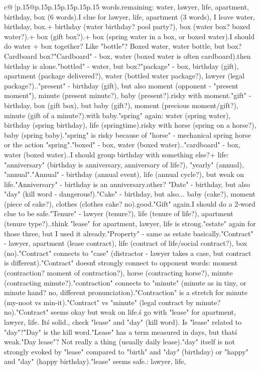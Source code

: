 \documentclass{article}
\begin{document}
{\begin{supertabular}{c@{$\;$}|p{.15\linewidth}@{}p{.15\linewidth}p{.15\linewidth}p{.15\linewidth}p{.15\linewidth}p{.15\linewidth}}
{{{words.\n\nCurrent remaining: water, lawyer, life, apartment, birthday, box (6 words).\n\nIf I clue for lawyer, life, apartment (3 words), I leave water, birthday, box.\nWater + birthday (water birthday? pool party?), box (water box? boxed water?).\nBirthday + box (gift box?).\nWater + box (spring water in a box, or boxed water).\n\nMaybe I should do water + box together? Like "bottle"? Boxed water, water bottle, but box? Cardboard box?\n"Cardboard" - box, water (boxed water is often cardboard).\nBut then birthday is alone.\n\n"bottled" - water, but box?\n"package" - box, birthday (gift), apartment (package delivered?), water (bottled water package?), lawyer (legal package?).\nWeak.\n\n"present" - birthday (gift), but also moment (opponent - "present moment"), minute (present minute?), baby (present?).\nToo risky with moment.\n\n"gift" - birthday, box (gift box), but baby (gift?), moment (precious moment/gift?), minute (gift of a minute?).\nRisky with baby.\n\n"spring" again: water (spring water), birthday (spring birthday), life (springtime).\nBut risky with horse (spring on a horse?), baby (spring baby).\n\nActually "spring" is risky because of "horse" - mechanical spring horse or the action "spring".\n\n"boxed" - box, water (boxed water)..\n\n"cardboard" - box, water (boxed water)..\n\nMaybe I should group birthday with something else?\n\nBirthday + life: "anniversary" (birthday is anniversary, anniversary of life?), "yearly" (annual), "annual".\n"Annual" - birthday (annual event), life (annual cycle?), but weak on life.\n"Anniversary" - birthday is an anniversary.\nAny other? "Date" - birthday, but also "day" (kill word - dangerous!).\n\n"Cake" - birthday, but also... baby (cake?), moment (piece of cake?), clothes (clothes cake? no).\nNot good.\n\n"Gift" again.\n\nMaybe I should do a 2-word clue to be safe.\n\n"Tenure" - lawyer (tenure?), life (tenure of life?), apartment (tenure type?).\nWeak.\n\nI think "lease" for apartment, lawyer, life is strong.\n\nOr "estate" again for those three, but I used it already.\n\n"Property" - same as estate basically.\n\n"Contract" - lawyer, apartment (lease contract), life (contract of life/social contract?), box (no).\n"Contract" connects to "case" (distractor - lawyer takes a case, but contract is different).\n"Contract" doesn\'t strongly connect to opponent words: moment (contraction? moment of contraction?), horse (contracting horse?), minute (contracting minute?).\nActually "contraction" connects to "minute" (minute as in tiny, or minute hand? no, different pronunciation).\n"Contraction" is a stretch for minute (my-noot vs min-it).\n"Contract" vs "minute" (legal contract by minute? no).\n\n"Contract" seems okay but weak on life.\n\nLet\'s go with "lease" for apartment, lawyer, life. It\'s solid.\n\nWait, check "lease" and "day" (kill word). Is "lease" related to "day"?\n"Day" is the kill word.\n"Lease" has a term measured in days, but that\'s weak.\n"Day lease"? Not really a thing (usually daily lease).\nBut "day" itself is not strongly evoked by "lease" compared to "birth" and "day" (birthday) or "happy" and "day" (happy birthday).\n\nSo "lease" seems safe.\n\nTargets: lawyer, life, }}}
\end{supertabular}}
\end{document}
